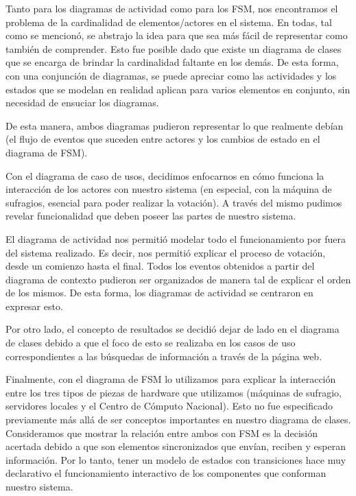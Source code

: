 \documentclass[spanish, 10pt,a4paper]{article}
\numberwithin{equation}{section} %
\begin{document}
Tanto para los diagramas de actividad como para los FSM, nos encontramos el problema de la cardinalidad de elementos/actores en el sistema. En todas, tal como se mencionó, se abstrajo la idea para que sea más fácil de representar como también de comprender. Esto fue posible dado que existe un diagrama de clases que se encarga de brindar la cardinalidad faltante en los demás. De esta forma, con una conjunción de diagramas, se puede apreciar como las actividades y los estados que se modelan en realidad aplican para varios elementos en conjunto, sin necesidad de ensuciar los diagramas. 
\par
 De esta manera, ambos diagramas pudieron representar lo que realmente debían (el flujo de eventos que suceden entre actores y los cambios de estado en el diagrama de FSM).
\par 
Con el diagrama de caso de usos, decidimos enfocarnos en cómo funciona la interacción de los actores con nuestro sistema (en especial, con la máquina de sufragios, esencial para poder realizar la votación). A través del mismo pudimos revelar funcionalidad que deben poseer las partes de nuestro sistema.
\par 
El diagrama de actividad nos permitió modelar todo el funcionamiento por fuera del sistema realizado. Es decir, nos permitió explicar el proceso de votación, desde un comienzo hasta el final. Todos los eventos obtenidos a partir del diagrama de contexto pudieron ser organizados de manera tal de explicar el orden de los mismos. De esta forma, los diagramas de actividad se centraron en expresar esto.
\par 
Por otro lado, el concepto de resultados se decidió dejar de lado en el diagrama de clases debido a que el foco de esto se realizaba en los casos de uso correspondientes a las búsquedas de información a través de la página web. 
\par 
Finalmente, con el diagrama de FSM lo utilizamos para explicar la interacción entre los tres tipos de piezas de hardware que utilizamos (máquinas de sufragio, servidores locales y el Centro de Cómputo Nacional). Esto no fue especificado previamente más allá de ser conceptos importantes en nuestro diagrama de clases. Consideramos que mostrar la relación entre ambos con FSM es la decisión acertada debido a que son elementos sincronizados que envían, reciben y esperan información. Por lo tanto, tener un modelo de estados con transiciones hace muy declarativo el funcionamiento interactivo de los componentes que conforman nuestro sistema.
	
\end{document}
